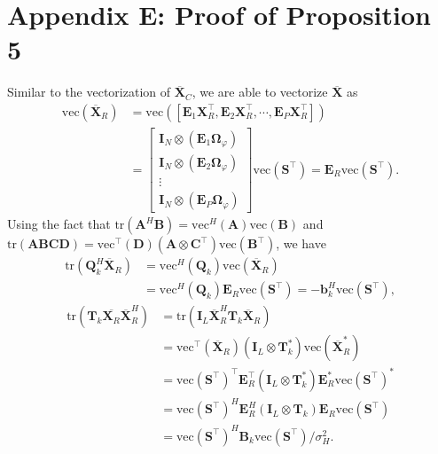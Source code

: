 \section*{Appendix E: Proof of Proposition 5}
\label{app:prop5}
Similar to the vectorization of $\overline{\mathbf{X}}_C$, we are able to vectorize $\overline{\mathbf{X}}$ as
\begin{equation}
\begin{aligned}
    \text{vec}(\overline{\mathbf{X}}_R) &= \text{vec}([\mathbf{E}_1\mathbf{X}_R^{\top},\mathbf{E}_2\mathbf{X}_R^{\top},\cdots,\mathbf{E}_P\mathbf{X}_R^{\top}])\\
    &= \begin{bmatrix}
        \mathbf{I}_N\otimes(\mathbf{E}_{1}\mathbf{\Omega}_{\varphi}) \\
        \mathbf{I}_N\otimes(\mathbf{E}_{2}\mathbf{\Omega}_{\varphi}) \\
        \vdots \\
        \mathbf{I}_N\otimes(\mathbf{E}_{P}\mathbf{\Omega}_{\varphi})
    \end{bmatrix}\text{vec}(\mathbf{S}^{\top}) = \mathbf{E}_R\text{vec}(\mathbf{S}^{\top}).
\end{aligned}
\end{equation}
Using the fact that $\text{tr}(\mathbf{A}^H\mathbf{B})=\text{vec}^H(\mathbf{A})\text{vec}(\mathbf{B})$ and $\text{tr}(\mathbf{ABCD})=\text{vec}^{\top}(\mathbf{D})(\mathbf{A}\otimes\mathbf{C}^{\top})\text{vec}(\mathbf{B}^{\top})$, we have
\begin{equation}
\begin{aligned}
    \text{tr}(\mathbf{Q}_k^H\overline{\mathbf{X}}_R) &= \text{vec}^H(\mathbf{Q}_k)\text{vec}(\overline{\mathbf{X}}_R) \\
    &= \text{vec}^H(\mathbf{Q}_k)\mathbf{E}_R\text{vec}(\mathbf{S}^{\top})
    = -\mathbf{b}_k^H\text{vec}(\mathbf{S}^{\top}),
\end{aligned}
\end{equation}
\begin{equation}
\begin{aligned}
    \text{tr}(\mathbf{T}_k\overline{\mathbf{X}_R}\overline{\mathbf{X}}_R^H) &= \text{tr}(\mathbf{I}_L\overline{\mathbf{X}}_R^H\mathbf{T}_k\overline{\mathbf{X}}_R) \\
    &= \text{vec}^{\top}(\overline{\mathbf{X}}_R)(\mathbf{I}_L\otimes\mathbf{T}_k^*)\text{vec}(\overline{\mathbf{X}}_R^*) \\
    &= \text{vec}(\mathbf{S}^{\top})^{\top}\mathbf{E}_R^{\top}(\mathbf{I}_L\otimes\mathbf{T}_k^*)\mathbf{E}_R^*\text{vec}(\mathbf{S}^{\top})^* \\
    &= \text{vec}(\mathbf{S}^{\top})^H\mathbf{E}_R^H(\mathbf{I}_L\otimes\mathbf{T}_k)\mathbf{E}_R\text{vec}(\mathbf{S}^{\top}) \\
    &= \text{vec}(\mathbf{S}^{\top})^H\mathbf{B}_k\text{vec}(\mathbf{S}^{\top})/\sigma_H^2.
\end{aligned}
\end{equation}
